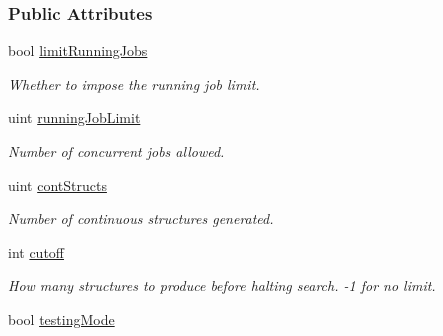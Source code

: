 \subsubsection*{Public Attributes}
\begin{DoxyCompactItemize}
\item 
\hypertarget{classGlobalSearch_1_1OptBase_a3b5202a4793e24dd7d42d1df9e94ee27}{}bool \hyperlink{classGlobalSearch_1_1OptBase_a3b5202a4793e24dd7d42d1df9e94ee27}{limit\+Running\+Jobs}\label{classGlobalSearch_1_1OptBase_a3b5202a4793e24dd7d42d1df9e94ee27}

\begin{DoxyCompactList}\small\item\em Whether to impose the running job limit. \end{DoxyCompactList}\item 
\hypertarget{classGlobalSearch_1_1OptBase_a02fd48b57bdd72ec4a4c20209967bd07}{}uint \hyperlink{classGlobalSearch_1_1OptBase_a02fd48b57bdd72ec4a4c20209967bd07}{running\+Job\+Limit}\label{classGlobalSearch_1_1OptBase_a02fd48b57bdd72ec4a4c20209967bd07}

\begin{DoxyCompactList}\small\item\em Number of concurrent jobs allowed. \end{DoxyCompactList}\item 
\hypertarget{classGlobalSearch_1_1OptBase_a973fbcff3e2abbc66c19236092439ce1}{}uint \hyperlink{classGlobalSearch_1_1OptBase_a973fbcff3e2abbc66c19236092439ce1}{cont\+Structs}\label{classGlobalSearch_1_1OptBase_a973fbcff3e2abbc66c19236092439ce1}

\begin{DoxyCompactList}\small\item\em Number of continuous structures generated. \end{DoxyCompactList}\item 
\hypertarget{classGlobalSearch_1_1OptBase_a6fe1eb9eef50d0c0851c7113cc8f24f0}{}int \hyperlink{classGlobalSearch_1_1OptBase_a6fe1eb9eef50d0c0851c7113cc8f24f0}{cutoff}\label{classGlobalSearch_1_1OptBase_a6fe1eb9eef50d0c0851c7113cc8f24f0}

\begin{DoxyCompactList}\small\item\em How many structures to produce before halting search. -\/1 for no limit. \end{DoxyCompactList}\item 
\hypertarget{classGlobalSearch_1_1OptBase_a4aee28dd2991e1ada81243d05a1f23c9}{}bool \hyperlink{classGlobalSearch_1_1OptBase_a4aee28dd2991e1ada81243d05a1f23c9}{testing\+Mode}\label{classGlobalSearch_1_1OptBase_a4aee28dd2991e1ada81243d05a1f23c9}


\end{DoxyCompactItemize}
